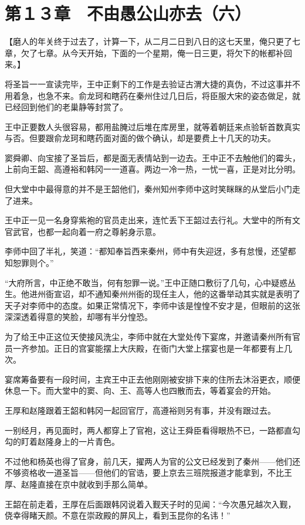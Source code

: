\section{第１３章　不由愚公山亦去（六）}

【磨人的年关终于过去了，计算一下，从二月二日到八日的这七天里，俺只更了七章，欠了七章。从今天开始，下面的一个星期，俺一日三更，将欠下的帐都补回来。】

将圣旨一一宣读完毕，王中正剩下的工作是去验证古渭大捷的真伪，不过这事并不用着急，也急不来。俞龙珂和瞎药在秦州住过几日后，将臣服大宋的姿态做足，就已经回到他们的老巢静等封赏了。

王中正要数人头很容易，都用盐腌过后堆在库房里，就等着朝廷来点验斩首数真实与否。但要跟俞龙珂和瞎药面对面的做个确认，却是要费上十几天的功夫。

窦舜卿、向宝接了圣旨后，都是面无表情站到一边去。王中正不去触他们的霉头，上前向王韶、高遵裕和韩冈一一道喜。两边一冷一热，一忧一喜，正是对比分明。

但大堂中中最得意的并不是王韶他们，秦州知州李师中这时笑眯眯的从堂后小门走了进来。

王中正一见一名身穿紫袍的官员走出来，连忙丢下王韶过去行礼。大堂中的所有文官武官，也都一起向着一府之尊躬身示意。

李师中回了半礼，笑道：“都知奉旨西来秦州，师中有失迎迓，多有怠慢，还望都知恕罪则个。”

“大府所言，中正绝不敢当，何有恕罪一说。”王中正随口敷衍了几句，心中疑惑丛生。他进州衙宣诏，却不通知秦州州衙的现任主人，他的这番举动其实就是表明了天子对李师中的态度。如果正常情况下，李师中该是惶惶不安才是，但眼前的这张深深透着得意的笑脸，却哪有半分惶恐。

为了给王中正这位天使接风洗尘，李师中就在大堂处传下宴席，并邀请秦州所有官员一齐参加。正日的宫宴能摆上大庆殿，在衙门大堂上摆宴也是一年都要有上几次。

宴席筹备要有一段时间，主宾王中正去他刚刚被安排下来的住所去沐浴更衣，顺便休息一下。而大堂中的窦、向、王、高等人也四散而去，等着宴会的开始。

王厚和赵隆跟着王韶和韩冈一起回官厅，高遵裕则另有事，并没有跟过去。

一别经月，再见面时，两人都穿上了官袍，这让王舜臣看得眼热不已，一路都直勾勾的盯着赵隆身上的一片青色。

不过他和杨英也得了官身，前几天，擢两人为官的公文已经发到了秦州——他们还不够资格收一道圣旨——但他们的官诰，要上京去三班院报道才能拿到，不比王厚、赵隆直接在京中就收到手那么简单。

王韶在前走着，王厚在后面跟韩冈说着入觐天子时的见闻：“今次愚兄越次入觐，侥幸得睹天颜。不意在崇政殿的屏风上，看到玉昆你的名讳！”

